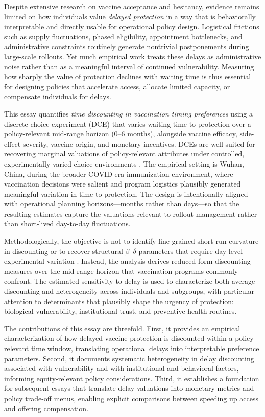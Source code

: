 \documentclass[doublespacing]{utdthesis}
\let\cite=\citep
\begin{document}
Despite extensive research on vaccine acceptance and hesitancy, evidence remains limited on how individuals value \emph{delayed protection} in a way that is behaviorally interpretable and directly usable for operational policy design. Logistical frictions such as supply fluctuations, phased eligibility, appointment bottlenecks, and administrative constraints routinely generate nontrivial postponements during large-scale rollouts. Yet much empirical work treats these delays as administrative noise rather than as a meaningful interval of continued vulnerability. Measuring how sharply the value of protection declines with waiting time is thus essential for designing policies that accelerate access, allocate limited capacity, or compensate individuals for delays.

This essay quantifies \emph{time discounting in vaccination timing preferences} using a discrete choice experiment (DCE) that varies waiting time to protection over a policy-relevant mid-range horizon (0--6 months), alongside vaccine efficacy, side-effect severity, vaccine origin, and monetary incentives. DCEs are well suited for recovering marginal valuations of policy-relevant attributes under controlled, experimentally varied choice environments \cite{Louviere2000,Train2009,Johnson2013ISPOR}. The empirical setting is Wuhan, China, during the broader COVID-era immunization environment, where vaccination decisions were salient and program logistics plausibly generated meaningful variation in time-to-protection. The design is intentionally aligned with operational planning horizons—months rather than days—so that the resulting estimates capture the valuations relevant to rollout management rather than short-lived day-to-day fluctuations.

Methodologically, the objective is not to identify fine-grained short-run curvature in discounting or to recover structural $\beta$--$\delta$ parameters that require day-level experimental variation \cite{Frederick2002,Laibson1997}. Instead, the analysis derives reduced-form discounting measures over the mid-range horizon that vaccination programs commonly confront. The estimated sensitivity to delay is used to characterize both average discounting and heterogeneity across individuals and subgroups, with particular attention to determinants that plausibly shape the urgency of protection: biological vulnerability, institutional trust, and preventive-health routines.

The contributions of this essay are threefold. First, it provides an empirical characterization of how delayed vaccine protection is discounted within a policy-relevant time window, translating operational delays into interpretable preference parameters. Second, it documents systematic heterogeneity in delay discounting associated with vulnerability and with institutional and behavioral factors, informing equity-relevant policy considerations. Third, it establishes a foundation for subsequent essays that translate delay valuations into monetary metrics and policy trade-off menus, enabling explicit comparisons between speeding up access and offering compensation.
\end{document}
